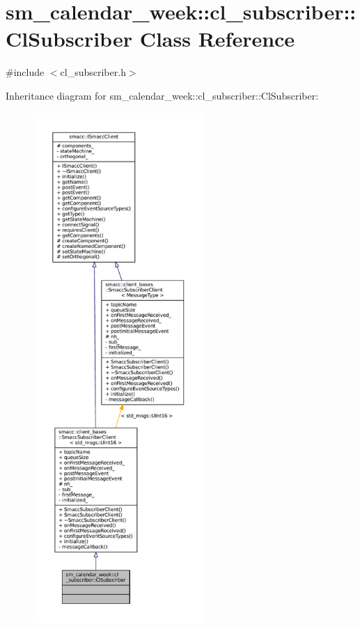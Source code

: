 \hypertarget{classsm__calendar__week_1_1cl__subscriber_1_1ClSubscriber}{}\section{sm\+\_\+calendar\+\_\+week\+:\+:cl\+\_\+subscriber\+:\+:Cl\+Subscriber Class Reference}
\label{classsm__calendar__week_1_1cl__subscriber_1_1ClSubscriber}


{\ttfamily \#include $<$cl\+\_\+subscriber.\+h$>$}



Inheritance diagram for sm\+\_\+calendar\+\_\+week\+:\+:cl\+\_\+subscriber\+:\+:Cl\+Subscriber\+:
\nopagebreak
\begin{figure}[H]
\begin{center}
\leavevmode
\includegraphics[height=550pt]{classsm__calendar__week_1_1cl__subscriber_1_1ClSubscriber__inherit__graph}
\end{center}
\end{figure}



